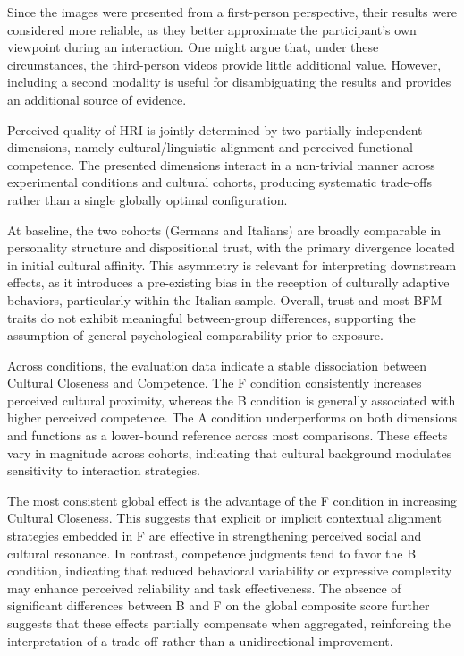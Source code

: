 Since the images were presented from a first-person perspective, their results were considered more reliable, as they better approximate the participant's own viewpoint during an interaction. One might argue that, under these circumstances, the third-person videos provide little additional value. However, including a second modality is useful for disambiguating the results and provides an additional source of evidence.

Perceived quality of HRI is jointly determined by two partially independent dimensions, namely cultural/linguistic alignment and perceived functional competence. The presented dimensions interact in a non-trivial manner across experimental conditions and cultural cohorts, producing systematic trade-offs rather than a single globally optimal configuration.

At baseline, the two cohorts (Germans and Italians) are broadly comparable in personality structure and dispositional trust, with the primary divergence located in initial cultural affinity. This asymmetry is relevant for interpreting downstream effects, as it introduces a pre-existing bias in the reception of culturally adaptive behaviors, particularly within the Italian sample. Overall, trust and most BFM traits do not exhibit meaningful between-group differences, supporting the assumption of general psychological comparability prior to exposure.

Across conditions, the evaluation data indicate a stable dissociation between Cultural Closeness and Competence. The F condition consistently increases perceived cultural proximity, whereas the B condition is generally associated with higher perceived competence. The A condition underperforms on both dimensions and functions as a lower-bound reference across most comparisons. These effects vary in magnitude across cohorts, indicating that cultural background modulates sensitivity to interaction strategies.

The most consistent global effect is the advantage of the F condition in increasing Cultural Closeness. This suggests that explicit or implicit contextual alignment strategies embedded in F are effective in strengthening perceived social and cultural resonance. In contrast, competence judgments tend to favor the B condition, indicating that reduced behavioral variability or expressive complexity may enhance perceived reliability and task effectiveness. The absence of significant differences between B and F on the global composite score further suggests that these effects partially compensate when aggregated, reinforcing the interpretation of a trade-off rather than a unidirectional improvement.

